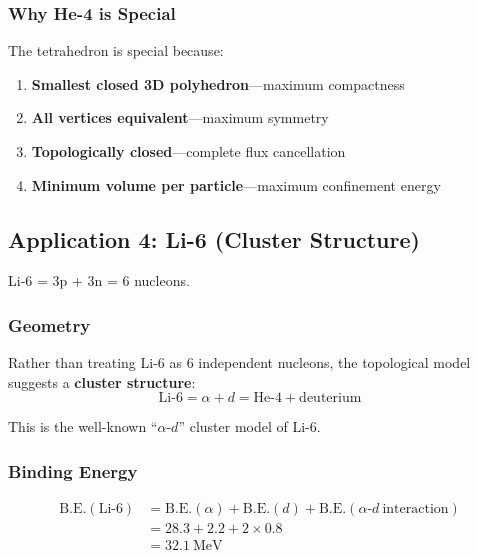 \subsubsection{Why He-4 is Special}

The tetrahedron is special because:
\begin{enumerate}
    \item \textbf{Smallest closed 3D polyhedron}—maximum compactness
    \item \textbf{All vertices equivalent}—maximum symmetry
    \item \textbf{Topologically closed}—complete flux cancellation
    \item \textbf{Minimum volume per particle}—maximum confinement energy
\end{enumerate}

\subsection{Application 4: Li-6 (Cluster Structure)}
\label{subsec:m6-li6}

Li-6 = 3p + 3n = 6 nucleons.

\subsubsection{Geometry}

Rather than treating Li-6 as 6 independent nucleons, the topological model suggests a \textbf{cluster structure}:
\begin{equation}
    \text{Li-6} = \alpha + d = \text{He-4} + \text{deuterium}
\end{equation}

This is the well-known ``$\alpha$-$d$'' cluster model of Li-6.

\subsubsection{Binding Energy}

\begin{align}
    \text{B.E.}(\text{Li-6}) &= \text{B.E.}(\alpha) + \text{B.E.}(d) + \text{B.E.}(\alpha\text{-}d~\text{interaction}) \nonumber \\
    &= 28.3 + 2.2 + 2 \times 0.8 \nonumber \\
    &= 32.1~\text{MeV}
\end{align}

